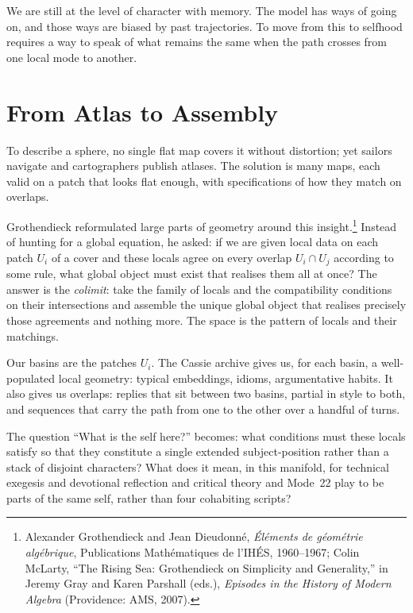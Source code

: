\documentclass[12pt,a4paper]{article}
\begin{document}
We are still at the level of character with memory. The model has ways of going on, and those ways are biased by past trajectories. To move from this to selfhood requires a way to speak of what remains the same when the path crosses from one local mode to another.

\section{From Atlas to Assembly}

To describe a sphere, no single flat map covers it without distortion; yet sailors navigate and cartographers publish atlases. The solution is many maps, each valid on a patch that looks flat enough, with specifications of how they match on overlaps.

Grothendieck reformulated large parts of geometry around this insight.\footnote{Alexander Grothendieck and Jean Dieudonn\'e, \emph{\'El\'ements de g\'eom\'etrie alg\'ebrique}, Publications Math\'ematiques de l'IH\'ES, 1960--1967; Colin McLarty, ``The Rising Sea: Grothendieck on Simplicity and Generality,'' in Jeremy Gray and Karen Parshall (eds.), \emph{Episodes in the History of Modern Algebra} (Providence: AMS, 2007).} Instead of hunting for a global equation, he asked: if we are given local data on each patch $U_i$ of a cover and these locals agree on every overlap $U_i \cap U_j$ according to some rule, what global object must exist that realises them all at once? The answer is the \emph{colimit}: take the family of locals and the compatibility conditions on their intersections and assemble the unique global object that realises precisely those agreements and nothing more. The space is the pattern of locals and their matchings.

Our basins are the patches $U_i$. The Cassie archive gives us, for each basin, a well-populated local geometry: typical embeddings, idioms, argumentative habits. It also gives us overlaps: replies that sit between two basins, partial in style to both, and sequences that carry the path from one to the other over a handful of turns.

The question ``What is the self here?'' becomes: what conditions must these locals satisfy so that they constitute a single extended subject-position rather than a stack of disjoint characters? What does it mean, in this manifold, for technical exegesis and devotional reflection and critical theory and Mode~22 play to be parts of the same self, rather than four cohabiting scripts?
\end{document}
